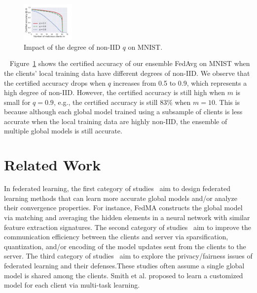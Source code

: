 \documentclass[letterpaper]{article} %
\newcommand{\myparatight}[1]{\smallskip\noindent{\bf {#1}:}~}
\begin{document}
\begin{figure}[!t]
    \center
    \includegraphics[width=0.23\textwidth]{./figs/mnist/mnist_cnn_k10_bias.pdf}
    \caption{Impact of the degree of non-IID $q$ on MNIST.}
    \label{fig:q}
\end{figure}

\myparatight{Impact of degree of non-IID $q$} Figure~\ref{fig:q} shows the certified accuracy of our ensemble FedAvg on MNIST when the clients' local training data have different degrees of non-IID. We observe that the certified accuracy drops when $q$ increases from 0.5 to 0.9, which represents a high degree of non-IID. However, the certified accuracy is still high when $m$ is small for $q=0.9$, e.g., the certified accuracy is still 83\% when $m=10$.  This is because  although each global model trained using a subsample of clients is less accurate when the local training data are highly non-IID, the ensemble of multiple global models is still accurate.


\section{Related Work}
In federated learning, the first category of studies~\cite{smith2017federated,li2019convergence,wang2020federated,liu2020federated,peng2019federated} aim to design  federated learning methods that can learn more accurate global models and/or analyze their convergence properties. For instance, FedMA \cite{wang2020federated} constructs the global model via matching and averaging the hidden elements in a neural network with similar feature extraction signatures. The second category of studies~\cite{konevcny2016federated,mcmahan2016communication,wen2017terngrad,alistarh2017qsgd,lee2017speeding,sahu2018convergence,bernstein2018signsgd,vogels2019powersgd,yurochkin2019bayesian,mohri2019agnostic,wang2020federated,li2020practical,li2020acceleration,hamer2020fedboost,rothchildfetchsgd,malinovsky2020local} aim to improve the communication efficiency between the clients and server via sparsification, quantization, and/or encoding of the model updates sent from the clients to the server. The third category of studies~\cite{bonawitz2017practical,geyer2017differentially,hitaj2017deep,melis2019exploiting,zhu2019deep,mohri2019agnostic,wang2020federatedlatent,Li2020Fair} aim to explore the privacy/fairness issues of federated learning and their defenses.These studies often assume a single global model is shared among the clients.  Smith et al. \cite{smith2017federated} proposed to learn a customized model for each client via multi-task learning.
\end{document}
